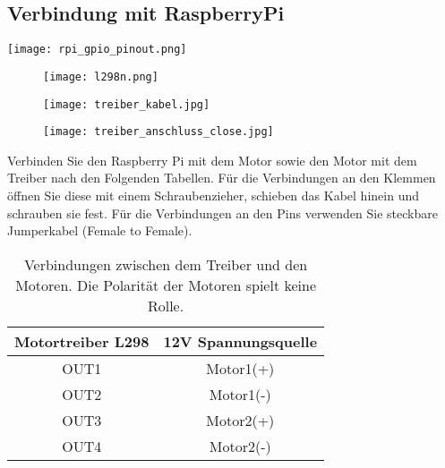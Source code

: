\subsection{Verbindung mit RaspberryPi}

\begin{center}
\texttt{[image: rpi\_gpio\_pinout.png]}
\end{center}

\begin{figure}[h]
\centering
\texttt{[image: l298n.png]}
\end{figure}

\begin{figure}[h]
\centering
\texttt{[image: treiber\_kabel.jpg]}
\end{figure}

\begin{figure}[h]
\centering
\texttt{[image: treiber\_anschluss\_close.jpg]}
\end{figure}


Verbinden Sie den Raspberry Pi mit dem Motor sowie den Motor mit dem Treiber nach den Folgenden Tabellen.
Für die Verbindungen an den Klemmen öffnen Sie diese mit einem Schraubenzieher, schieben das Kabel hinein und schrauben sie fest. Für die Verbindungen an den Pins verwenden Sie steckbare Jumperkabel (Female to Female).\\

\begin{table}[h]
  \begin{center}
\begin{tabular}{@{}cc@{}}
\toprule
Motortreiber L298 & 12V Spannungsquelle \\ \midrule
OUT1              & Motor1(+)           \\
OUT2              & Motor1(-)           \\
OUT3              & Motor2(+)           \\
OUT4              & Motor2(-)           \\ \bottomrule
\end{tabular}
\end{center}
\caption{Verbindungen zwischen dem Treiber und den Motoren. Die Polarität der Motoren spielt keine Rolle.}
\end{table}



